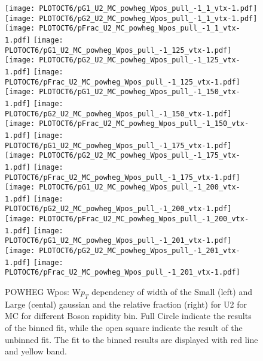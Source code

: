 \documentclass[41pt,a4paper,oneside]{report}
\begin{document}
\begin{figure}[h!]
  \begin{center}
    \texttt{[image: PLOTOCT6/pG1\_U2\_MC\_powheg\_Wpos\_pull\_-1\_1\_vtx-1.pdf]}
    \texttt{[image: PLOTOCT6/pG2\_U2\_MC\_powheg\_Wpos\_pull\_-1\_1\_vtx-1.pdf]}
    \texttt{[image: PLOTOCT6/pFrac\_U2\_MC\_powheg\_Wpos\_pull\_-1\_1\_vtx-1.pdf]} 
    \texttt{[image: PLOTOCT6/pG1\_U2\_MC\_powheg\_Wpos\_pull\_-1\_125\_vtx-1.pdf]}
    \texttt{[image: PLOTOCT6/pG2\_U2\_MC\_powheg\_Wpos\_pull\_-1\_125\_vtx-1.pdf]}
    \texttt{[image: PLOTOCT6/pFrac\_U2\_MC\_powheg\_Wpos\_pull\_-1\_125\_vtx-1.pdf]} 
    \texttt{[image: PLOTOCT6/pG1\_U2\_MC\_powheg\_Wpos\_pull\_-1\_150\_vtx-1.pdf]}
    \texttt{[image: PLOTOCT6/pG2\_U2\_MC\_powheg\_Wpos\_pull\_-1\_150\_vtx-1.pdf]}
    \texttt{[image: PLOTOCT6/pFrac\_U2\_MC\_powheg\_Wpos\_pull\_-1\_150\_vtx-1.pdf]} 
    \texttt{[image: PLOTOCT6/pG1\_U2\_MC\_powheg\_Wpos\_pull\_-1\_175\_vtx-1.pdf]}
    \texttt{[image: PLOTOCT6/pG2\_U2\_MC\_powheg\_Wpos\_pull\_-1\_175\_vtx-1.pdf]}
    \texttt{[image: PLOTOCT6/pFrac\_U2\_MC\_powheg\_Wpos\_pull\_-1\_175\_vtx-1.pdf]} 
    \texttt{[image: PLOTOCT6/pG1\_U2\_MC\_powheg\_Wpos\_pull\_-1\_200\_vtx-1.pdf]}
    \texttt{[image: PLOTOCT6/pG2\_U2\_MC\_powheg\_Wpos\_pull\_-1\_200\_vtx-1.pdf]}
    \texttt{[image: PLOTOCT6/pFrac\_U2\_MC\_powheg\_Wpos\_pull\_-1\_200\_vtx-1.pdf]} 
    \texttt{[image: PLOTOCT6/pG1\_U2\_MC\_powheg\_Wpos\_pull\_-1\_201\_vtx-1.pdf]}
    \texttt{[image: PLOTOCT6/pG2\_U2\_MC\_powheg\_Wpos\_pull\_-1\_201\_vtx-1.pdf]}
    \texttt{[image: PLOTOCT6/pFrac\_U2\_MC\_powheg\_Wpos\_pull\_-1\_201\_vtx-1.pdf]} 
    \caption{POWHEG Wpos: W$p_{T}$ dependency of width of the Small (left) and Large (cental) gaussian and the relative fraction (right) for U2 for MC for different Boson rapidity bin. Full Circle indicate the results of the binned fit, while the open square indicate the result of the unbinned fit. The fit to the binned results are displayed with red line and yellow band. {\color{blue}{plot oder than OCT6}}
\newline
}
    \label{fig:SmallLargeU2POWpos}
  \end{center}
\end{figure}


\end{document}
